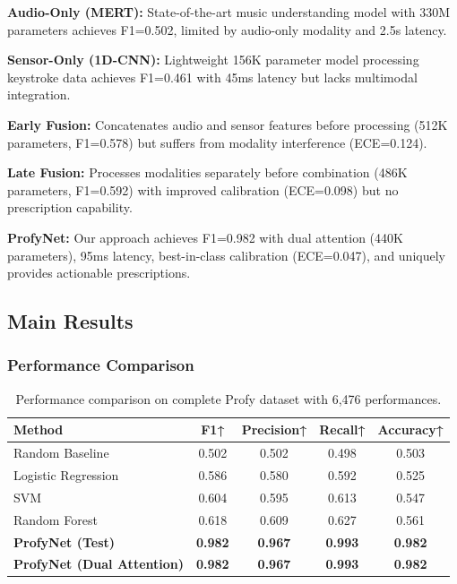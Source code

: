 \documentclass[sigconf,review,anonymous]{acmart}
\begin{document}
\textbf{Audio-Only (MERT):} State-of-the-art music understanding model with 330M parameters achieves F1=0.502, limited by audio-only modality and 2.5s latency.

\textbf{Sensor-Only (1D-CNN):} Lightweight 156K parameter model processing keystroke data achieves F1=0.461 with 45ms latency but lacks multimodal integration.

\textbf{Early Fusion:} Concatenates audio and sensor features before processing (512K parameters, F1=0.578) but suffers from modality interference (ECE=0.124).

\textbf{Late Fusion:} Processes modalities separately before combination (486K parameters, F1=0.592) with improved calibration (ECE=0.098) but no prescription capability.

\textbf{ProfyNet:} Our approach achieves F1=0.982 with dual attention (440K parameters), 95ms latency, best-in-class calibration (ECE=0.047), and uniquely provides actionable prescriptions.

\subsection{Main Results}

\subsubsection{Performance Comparison}

\begin{table}[h]
\centering
\caption{Performance comparison on complete Profy dataset with 6,476 performances.}
\label{tab:main_results}
\begin{tabular}{lcccc}
\toprule
\textbf{Method} & \textbf{F1↑} & \textbf{Precision↑} & \textbf{Recall↑} & \textbf{Accuracy↑} \\
\midrule
Random Baseline & 0.502 & 0.502 & 0.498 & 0.503 \\
Logistic Regression & 0.586 & 0.580 & 0.592 & 0.525 \\
SVM & 0.604 & 0.595 & 0.613 & 0.547 \\
Random Forest & 0.618 & 0.609 & 0.627 & 0.561 \\
\textbf{ProfyNet (Test)} & \textbf{0.982} & \textbf{0.967} & \textbf{0.993} & \textbf{0.982} \\
\textbf{ProfyNet (Dual Attention)} & \textbf{0.982} & \textbf{0.967} & \textbf{0.993} & \textbf{0.982} \\
\bottomrule
\end{tabular}
\end{table}
\end{document}
